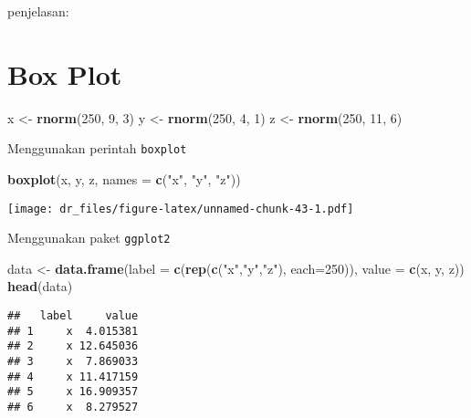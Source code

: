 \documentclass[
]{book}
\newenvironment{Shaded}{\begin{snugshade}}{\end{snugshade}}
\newcommand{\DataTypeTok}[1]{\textcolor[rgb]{0.13,0.29,0.53}{#1}}
\newcommand{\DecValTok}[1]{\textcolor[rgb]{0.00,0.00,0.81}{#1}}
\newcommand{\KeywordTok}[1]{\textcolor[rgb]{0.13,0.29,0.53}{\textbf{#1}}}
\newcommand{\NormalTok}[1]{#1}
\newcommand{\StringTok}[1]{\textcolor[rgb]{0.31,0.60,0.02}{#1}}
\begin{document}
penjelasan:

\hypertarget{box-plot}{%
\section{Box Plot}\label{box-plot}}

\begin{Shaded}
\begin{Highlighting}[]
\NormalTok{x <-}\StringTok{ }\KeywordTok{rnorm}\NormalTok{(}\DecValTok{250}\NormalTok{, }\DecValTok{9}\NormalTok{, }\DecValTok{3}\NormalTok{)}
\NormalTok{y <-}\StringTok{ }\KeywordTok{rnorm}\NormalTok{(}\DecValTok{250}\NormalTok{, }\DecValTok{4}\NormalTok{, }\DecValTok{1}\NormalTok{)}
\NormalTok{z <-}\StringTok{ }\KeywordTok{rnorm}\NormalTok{(}\DecValTok{250}\NormalTok{, }\DecValTok{11}\NormalTok{, }\DecValTok{6}\NormalTok{)}
\end{Highlighting}
\end{Shaded}

Menggunakan perintah \texttt{boxplot}

\begin{Shaded}
\begin{Highlighting}[]
\KeywordTok{boxplot}\NormalTok{(x, y, z,}
        \DataTypeTok{names =} \KeywordTok{c}\NormalTok{(}\StringTok{"x"}\NormalTok{, }\StringTok{"y"}\NormalTok{, }\StringTok{"z"}\NormalTok{))}
\end{Highlighting}
\end{Shaded}

\texttt{[image: dr\_files/figure-latex/unnamed-chunk-43-1.pdf]}

Menggunakan paket \texttt{ggplot2}

\begin{Shaded}
\begin{Highlighting}[]
\NormalTok{data <-}\StringTok{ }\KeywordTok{data.frame}\NormalTok{(}\DataTypeTok{label =} \KeywordTok{c}\NormalTok{(}\KeywordTok{rep}\NormalTok{(}\KeywordTok{c}\NormalTok{(}\StringTok{"x"}\NormalTok{,}\StringTok{"y"}\NormalTok{,}\StringTok{"z"}\NormalTok{),}
                                 \DataTypeTok{each=}\DecValTok{250}\NormalTok{)),}
                   \DataTypeTok{value =} \KeywordTok{c}\NormalTok{(x, y, z))}
\KeywordTok{head}\NormalTok{(data)}
\end{Highlighting}
\end{Shaded}

\begin{verbatim}
##   label     value
## 1     x  4.015381
## 2     x 12.645036
## 3     x  7.869033
## 4     x 11.417159
## 5     x 16.909357
## 6     x  8.279527
\end{verbatim}
\end{document}
